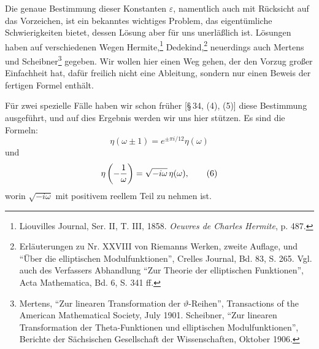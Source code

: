 \documentclass[11pt]{article}
\begin{document}
Die genaue Bestimmung dieser Konstanten $\varepsilon$, namentlich auch mit Rücksicht auf das Vorzeichen, ist ein bekanntes wichtiges Problem, das eigentümliche Schwierigkeiten bietet, dessen Lösung aber für uns unerläßlich ist. Lösungen haben auf verschiedenen Wegen Hermite,\footnote{Liouvilles Journal, Ser. II, T. III, 1858. \emph{Oeuvres de Charles Hermite}, p. 487.} Dedekind,\footnote{Erläuterungen zu Nr. XXVIII von Riemanns Werken, zweite Auflage, und ``Über die elliptischen Modulfunktionen'', Crelles Journal, Bd. 83, S. 265. Vgl. auch des Verfassers Abhandlung ``Zur Theorie der elliptischen Funktionen'', Acta Mathematica, Bd. 6, S. 341 ff.} neuerdings auch Mertens und Scheibner\footnote{Mertens, ``Zur linearen Transformation der $\vartheta$-Reihen'', Transactions of the American Mathematical Society, July 1901. Scheibner, ``Zur linearen Transformation der Theta-Funktionen und elliptischen Modulfunktionen'', Berichte der Sächsischen Gesellschaft der Wissenschaften, Oktober 1906.} gegeben. Wir wollen hier einen Weg gehen, der den Vorzug großer Einfachheit hat, dafür freilich nicht eine Ableitung, sondern nur einen Beweis der fertigen Formel enthält.

Für zwei spezielle Fälle haben wir schon früher [\S\,34, (4), (5)] diese Bestimmung ausgeführt, und auf dies Ergebnis werden wir uns hier stützen. Es sind die Formeln:
\begin{equation}
\eta(\omega\pm1)=e^{\pm\pi i/12}\eta(\omega) 
\tag{5}
\end{equation}
und
\begin{equation}
\eta\left(-{1\over\omega}\right)=\sqrt{-i\omega}\,\eta(\omega),
\tag{6}
\end{equation}
worin $\sqrt{-i\omega}$ mit positivem reellem Teil zu nehmen ist.
\end{document}
